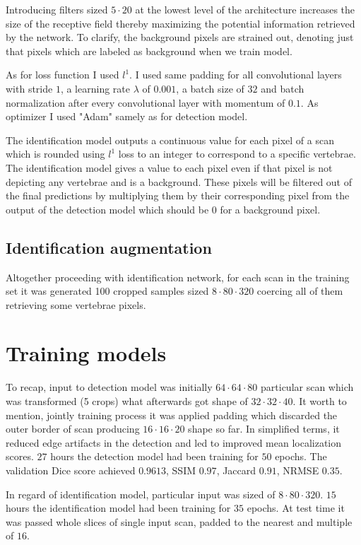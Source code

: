 Introducing filters sized $5 \cdot 20$ at the lowest level of the architecture  increases the size of the receptive field thereby maximizing the potential information retrieved by the network. To clarify, the background pixels are strained out, denoting just that pixels which are labeled as background when we train model. 

As for loss function I used $l^{1}$. I used same padding for all convolutional layers with stride $1$, a learning rate
$\lambda$ of $0.001$, a batch size of $32$ and batch normalization after every convolutional layer with momentum of $0.1$. As optimizer I used "Adam" samely as for detection model.  

The identification model outputs a continuous value for each pixel of a scan which is rounded using $l^{1}$ loss to an integer to correspond to a specific vertebrae. The identification model gives a value to each pixel even if that pixel is not depicting any vertebrae and is a background. These pixels will be filtered out of the final predictions by multiplying them by their corresponding pixel from the output of the detection model which should be 0 for a background pixel. 

\subsection{Identification augmentation}
Altogether proceeding with identification network, for each scan in the training set it was generated 100 cropped samples sized $8 \cdot 80 \cdot 320$ coercing all of them retrieving some vertebrae pixels. 

\section{Training models}
To recap, input to detection model was initially $64 \cdot 64 \cdot 80$ particular scan which was transformed (5 crops) what afterwards got shape of $32 \cdot 32 \cdot 40$. It worth to mention, jointly training process it was applied padding which discarded the outer border of scan producing $16 \cdot 16 \cdot 20$ shape so far. In simplified terms, it reduced edge artifacts in the detection and led to improved mean localization scores. $27$ hours the detection model had been training for $50$ epochs. The validation Dice score achieved $0.9613$, SSIM $0.97$, Jaccard $0.91$, NRMSE $0.35$.   

In regard of identification model, particular input was sized of $8 \cdot 80 \cdot 320$. $15$ hours the identification model had been training for $35$ epochs. At test time it was passed whole slices of single input scan, padded to the nearest and multiple of $16$.


